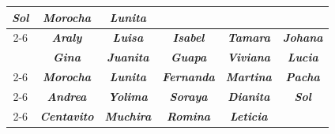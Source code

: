 \begin{table}[H]
{\begin{tabular}{|c|ccccc|}
      \multicolumn{1}{c|}{\cellcolor[HTML]{A3E1F3}\textit{\textbf{Sol}}} &
      \multicolumn{1}{c|}{\cellcolor[HTML]{A3E1F3}\textit{\textbf{Morocha}}} &
      \textit{\textbf{Lunita}} \\ \cline{2-6}
    \rowcolor[HTML]{A3E1F3}
    \multirow{-6}{*}{\cellcolor[HTML]{1122C6}{\color[HTML]{FFFFFF} \textit{\textbf{2}}}} &
      \multicolumn{1}{c|}{\cellcolor[HTML]{A3E1F3}\textit{\textbf{Araly}}} &
      \multicolumn{1}{c|}{\cellcolor[HTML]{A3E1F3}\textit{\textbf{Luisa}}} &
      \multicolumn{1}{c|}{\cellcolor[HTML]{A3E1F3}\textit{\textbf{Isabel}}} &
      \multicolumn{1}{c|}{\cellcolor[HTML]{A3E1F3}\textit{\textbf{Tamara}}} &
      \textit{\textbf{Johana}} \\ \hline
    \rowcolor[HTML]{A1DA8E}
    \cellcolor[HTML]{32CB00} &
      \multicolumn{1}{c|}{\cellcolor[HTML]{A1DA8E}\textit{\textbf{Gina}}} &
      \multicolumn{1}{c|}{\cellcolor[HTML]{A1DA8E}\textit{\textbf{Juanita}}} &
      \multicolumn{1}{c|}{\cellcolor[HTML]{A1DA8E}\textit{\textbf{Guapa}}} &
      \multicolumn{1}{c|}{\cellcolor[HTML]{A1DA8E}\textit{\textbf{Viviana}}} &
      \textit{\textbf{Lucia}} \\ \cline{2-6}
    \rowcolor[HTML]{A1DA8E}
    \cellcolor[HTML]{32CB00} &
      \multicolumn{1}{c|}{\cellcolor[HTML]{A1DA8E}\textit{\textbf{Morocha}}} &
      \multicolumn{1}{c|}{\cellcolor[HTML]{A1DA8E}\textit{\textbf{Lunita}}} &
      \multicolumn{1}{c|}{\cellcolor[HTML]{A1DA8E}\textit{\textbf{Fernanda}}} &
      \multicolumn{1}{c|}{\cellcolor[HTML]{A1DA8E}\textit{\textbf{Martina}}} &
      \textit{\textbf{Pacha}} \\ \cline{2-6}
    \rowcolor[HTML]{A1DA8E}
    \cellcolor[HTML]{32CB00} &
      \multicolumn{1}{c|}{\cellcolor[HTML]{A1DA8E}\textit{\textbf{Andrea}}} &
      \multicolumn{1}{c|}{\cellcolor[HTML]{A1DA8E}\textit{\textbf{Yolima}}} &
      \multicolumn{1}{c|}{\cellcolor[HTML]{A1DA8E}\textit{\textbf{Soraya}}} &
      \multicolumn{1}{c|}{\cellcolor[HTML]{A1DA8E}\textit{\textbf{Dianita}}} &
      \textit{\textbf{Sol}} \\ \cline{2-6}
    \rowcolor[HTML]{A1DA8E}
    \multirow{-4}{*}{\cellcolor[HTML]{32CB00}\textit{\textbf{3}}} &
      \multicolumn{1}{c|}{\cellcolor[HTML]{A1DA8E}\textit{\textbf{Centavito}}} &
      \multicolumn{1}{c|}{\cellcolor[HTML]{A1DA8E}\textit{\textbf{Muchira}}} &
      \multicolumn{1}{c|}{\cellcolor[HTML]{A1DA8E}\textit{\textbf{Romina}}} &
      \multicolumn{1}{c|}{\cellcolor[HTML]{A1DA8E}\textit{\textbf{Leticia}}} &
      \textit{\textbf{}} \\ \hline

\end{tabular}}
\end{table}
